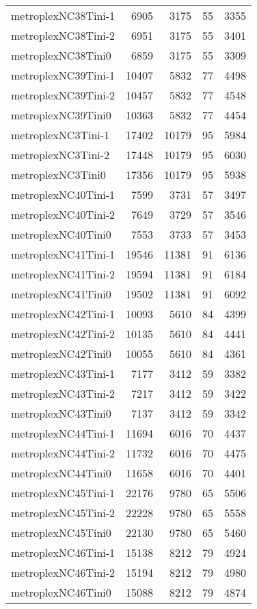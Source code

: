 \begin{longtable}{lrrrr}
metroplexNC38Tini-1 & 6905 & 3175 & 55 & 3355 \\
metroplexNC38Tini-2 & 6951 & 3175 & 55 & 3401 \\
metroplexNC38Tini0 & 6859 & 3175 & 55 & 3309 \\
metroplexNC39Tini-1 & 10407 & 5832 & 77 & 4498 \\
metroplexNC39Tini-2 & 10457 & 5832 & 77 & 4548 \\
metroplexNC39Tini0 & 10363 & 5832 & 77 & 4454 \\
metroplexNC3Tini-1 & 17402 & 10179 & 95 & 5984 \\
metroplexNC3Tini-2 & 17448 & 10179 & 95 & 6030 \\
metroplexNC3Tini0 & 17356 & 10179 & 95 & 5938 \\
metroplexNC40Tini-1 & 7599 & 3731 & 57 & 3497 \\
metroplexNC40Tini-2 & 7649 & 3729 & 57 & 3546 \\
metroplexNC40Tini0 & 7553 & 3733 & 57 & 3453 \\
metroplexNC41Tini-1 & 19546 & 11381 & 91 & 6136 \\
metroplexNC41Tini-2 & 19594 & 11381 & 91 & 6184 \\
metroplexNC41Tini0 & 19502 & 11381 & 91 & 6092 \\
metroplexNC42Tini-1 & 10093 & 5610 & 84 & 4399 \\
metroplexNC42Tini-2 & 10135 & 5610 & 84 & 4441 \\
metroplexNC42Tini0 & 10055 & 5610 & 84 & 4361 \\
metroplexNC43Tini-1 & 7177 & 3412 & 59 & 3382 \\
metroplexNC43Tini-2 & 7217 & 3412 & 59 & 3422 \\
metroplexNC43Tini0 & 7137 & 3412 & 59 & 3342 \\
metroplexNC44Tini-1 & 11694 & 6016 & 70 & 4437 \\
metroplexNC44Tini-2 & 11732 & 6016 & 70 & 4475 \\
metroplexNC44Tini0 & 11658 & 6016 & 70 & 4401 \\
metroplexNC45Tini-1 & 22176 & 9780 & 65 & 5506 \\
metroplexNC45Tini-2 & 22228 & 9780 & 65 & 5558 \\
metroplexNC45Tini0 & 22130 & 9780 & 65 & 5460 \\
metroplexNC46Tini-1 & 15138 & 8212 & 79 & 4924 \\
metroplexNC46Tini-2 & 15194 & 8212 & 79 & 4980 \\
metroplexNC46Tini0 & 15088 & 8212 & 79 & 4874 \\

\end{longtable}

